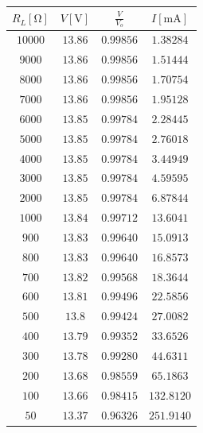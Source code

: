 \begin{table}[H]
	\begin{subtable}[c]{0.5\textwidth}
		\centering
			\begin{tabular}{ c | c | c | c}
			$R_L [\unit{\ohm}]$ & $V [\unit{\volt}]$ & $\frac{V}{V_o}$ & $I [\unit{\milli\ampere}]$ \\
			\hline
			$10000$ & $13.86$ & $0.99856$ & $1.38284$ \\
			$9000$ & $13.86$ & $0.99856$ & $1.51444$ \\
			$8000$ & $13.86$ & $0.99856$ & $1.70754$ \\
			$7000$ & $13.86$ & $0.99856$ & $1.95128$ \\
			$6000$ & $13.85$ & $0.99784$ & $2.28445$ \\
			$5000$ & $13.85$ & $0.99784$ & $2.76018$ \\
			$4000$ & $13.85$ & $0.99784$ & $3.44949$ \\
			$3000$ & $13.85$ & $0.99784$ & $4.59595$ \\
			$2000$ & $13.85$ & $0.99784$ & $6.87844$ \\
			$1000$ & $13.84$ & $0.99712$ & $13.6041$ \\
			$900$ & $13.83$ & $0.99640$ & $15.0913$ \\
			$800$ & $13.83$ & $0.99640$ & $16.8573$ \\
			$700$ & $13.82$ & $0.99568$ & $18.3644$ \\
			$600$ & $13.81$ & $0.99496$ & $22.5856$ \\
			$500$ & $13.8$ & $0.99424$ & $27.0082$ \\
			$400$ & $13.79$ & $0.99352$ & $33.6526$ \\
			$300$ & $13.78$ & $0.99280$ & $44.6311$ \\
			$200$ & $13.68$ & $0.98559$ & $65.1863$ \\
			$100$ & $13.66$ & $0.98415$ & $132.8120$ \\
			$50$ & $13.37$ & $0.96326$ & $251.9140$ \\
		\end{tabular}
	\end{subtable}
	\caption{}
\end{table}

